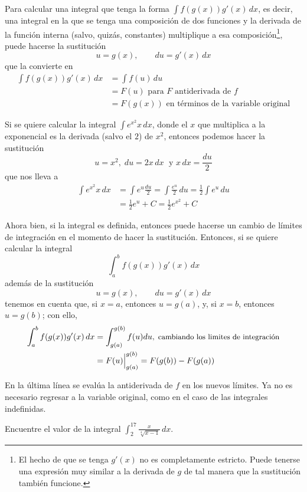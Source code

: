 Para calcular una integral que tenga la forma $\int f(g(x))g'(x)\,dx$, es decir, una integral en la que se tenga una composición de dos funciones y la derivada de la función interna (salvo, quizás, constantes) multiplique a esa composición\footnote{El hecho de que se tenga $g'(x)$ no es completamente estricto. Puede tenerse una expresión muy similar a la derivada de $g$ de tal manera que la sustitución también funcione.}, puede hacerse la sustitución
\[u=g(x), \qquad du=g'(x)\,dx\]
que la convierte en
\begin{align*}
  \int f(g(x))g'(x)\,dx&=\int f(u)\, du\\
  &=F(u)\text{\ para $F$ antiderivada de $f$}\\
  &=F(g(x))\text{ en términos de la variable original}
\end{align*}

\begin{ejemplo}
  Si se quiere calcular la integral $\int e^{x^2}x\,dx$, donde el $x$ que multiplica a la exponencial es la derivada (salvo el $2$) de $x^2$, entonces podemos hacer la sustitución
  \[
    u=x^2,\; du=2x\,dx\; \text{ y } x\,dx=\frac{du}{2}
  \]
  que nos lleva a
  \begin{align*}
    \int e^{x^2}x\, dx&=\int e^{u}\frac{du}{2}=\int \frac{e^u}{2}\, du
    =\frac{1}{2}\int e^u\, du\\
    &=\frac{1}{2}e^u+C=\frac{1}{2}e^{x^2}+C
  \end{align*}
\end{ejemplo}

Ahora bien, si la integral es definida, entonces puede hacerse un cambio de límites de integración en el momento de hacer la sustitución. Entonces, si se quiere calcular la integral
\[
  \int_{a}^{b}f(g(x))g'(x)\,dx
\]
además de la sustitución
\[
  u=g(x),\qquad du=g'(x)\,dx
\]
tenemos en cuenta que, si $x=a$, entonces $u=g\left( a\right)$, y, si $x=b$, entonces $u=g\left( b\right)$; con ello,
\begin{align*}
  \int_{a}^{b}f(g(x))g'(x)\,dx&=
  \int_{g(a)}^{g(b)}f(u)du,\; \text{\small cambiando los limites de integración}\\
  &=F(u)\Big\vert_{g(a)}^{g(b)}=F(g(b))-F(g(a))
\end{align*}

En la última línea se evalúa la antiderivada de $f$ en los nuevos límites. Ya no es necesario regresar a la variable original, como en el caso de las integrales indefinidas.

\begin{ejemplo}
  Encuentre el valor de la integral $\int_{2}^{17}\frac{x}{\sqrt[4]{x-1}}\,dx$.
\end{ejemplo}

